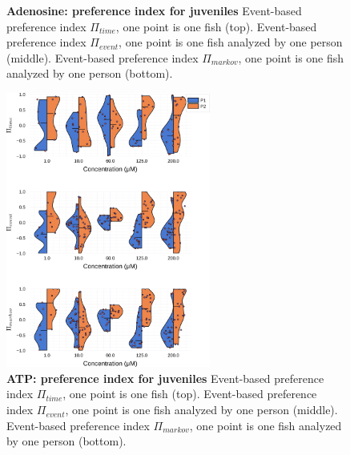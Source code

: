 \begin{appendices}
\begin{figure}[h]
      \caption{\textbf{Adenosine: preference index for juveniles} Event-based preference index $\Pi_{time}$, one point is one fish (top). Event-based preference index $\Pi_{event}$, one point is one fish analyzed by one person (middle). Event-based preference index $\Pi_{markov}$, one point is one fish analyzed by one person (bottom).}
      \label{dist_adenosine}
    \end{figure}
    \begin{figure}[h]
      \centering
      \includegraphics[width=0.6\textwidth]{part_2/assets/dist_atp.png}
      \caption{\textbf{ATP: preference index for juveniles} Event-based preference index $\Pi_{time}$, one point is one fish (top). Event-based preference index $\Pi_{event}$, one point is one fish analyzed by one person (middle). Event-based preference index $\Pi_{markov}$, one point is one fish analyzed by one person (bottom).}
      \label{dist_atp}
    \end{figure}

\end{appendices}
